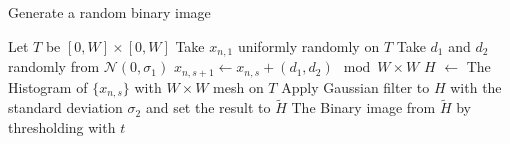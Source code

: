 \documentclass[smallextended]{svjour3}
\begin{document}
\begin{algorithm}[h!]
  \caption{Generate a random binary image}
  \label{alg:randomimage}
    \begin{algorithmic}
    \State Let $T$ be $[0, W]\times [0, W]$
      \State Take $x_{n,1}$ uniformly randomly on $T$
        \State Take $d_1$ and $d_2$ randomly from ${\mathcal N}(0, \sigma_1)$
        \State $x_{n,s+1} \gets x_{n,s} + (d_1, d_2) \mod W \times W$
      \EndFor
    \EndFor
    \State $H$ $\gets$ The Histogram of $\{x_{n,s}\}$ with $W\times W$
      mesh on $T$
    \State Apply Gaussian filter to $H$ with the standard deviation $\sigma_2$ and set the result to $\tilde{H}$
    \State \Return The Binary image from $\tilde{H}$ by thresholding with $t$
    \EndProcedure
  \end{algorithmic}

\end{algorithm}
\end{document}
